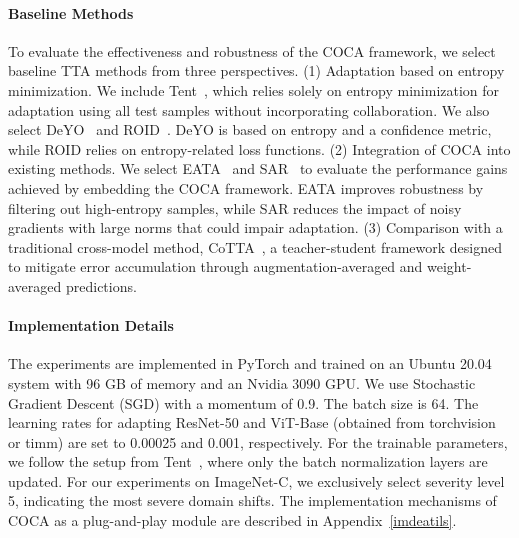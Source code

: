 \vspace{-10pt}
\paragraph{Baseline Methods} To evaluate the effectiveness and robustness of the COCA framework, we select baseline TTA methods from three perspectives. (1) Adaptation based on entropy minimization. We include Tent~\cite{wang2020tent}, which relies solely on entropy minimization for adaptation using all test samples without incorporating collaboration. We also select DeYO~\cite{lee2024entropy2} and ROID~\cite{marsden2024universal2}. DeYO is based on entropy and a confidence metric, while ROID relies on entropy-related loss functions. (2) Integration of COCA into existing methods. We select EATA~\cite{niu2022efficient} and SAR~\cite{niu2023towards} to evaluate the performance gains achieved by embedding the COCA framework. EATA improves robustness by filtering out high-entropy samples, while SAR reduces the impact of noisy gradients with large norms that could impair adaptation. (3) Comparison with a traditional cross-model method, CoTTA~\cite{wang2022continual}, a teacher-student framework designed to mitigate error accumulation through augmentation-averaged and weight-averaged predictions. 



\vspace{-13pt}
\paragraph{Implementation Details} The experiments are implemented in PyTorch and trained on an Ubuntu 20.04 system with 96 GB of memory and an Nvidia 3090 GPU. We use Stochastic Gradient Descent (SGD) with a momentum of 0.9. The batch size is 64. The learning rates for adapting ResNet-50 and ViT-Base (obtained from torchvision or timm) are set to 0.00025 and 0.001, respectively. For the trainable parameters, we follow the setup from Tent~\cite{wang2020tent}, where only the batch normalization layers are updated. For our experiments on ImageNet-C, we exclusively select severity level 5, indicating the most severe domain shifts. The implementation mechanisms of COCA as a plug-and-play module are described in Appendix~\ref{imdeatils}.

